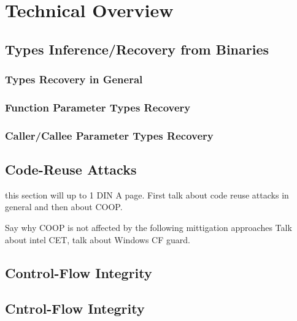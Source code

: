 \chapter{Technical Overview}
\label{chapter:Technical Overview}

\section{Types Inference/Recovery from Binaries}
\subsection{Types Recovery in General}
\subsection{Function Parameter Types Recovery}
\subsection{Caller/Callee Parameter Types Recovery}

\section{Code-Reuse Attacks}
this section will up to 1 DIN A page. First talk about code reuse attacks in general and then 
about COOP.

Say why COOP is not affected by the following mittigation approaches
Talk about intel CET, talk about Windows CF guard.


\section{Control-Flow Integrity}

\section{Cntrol-Flow Integrity}